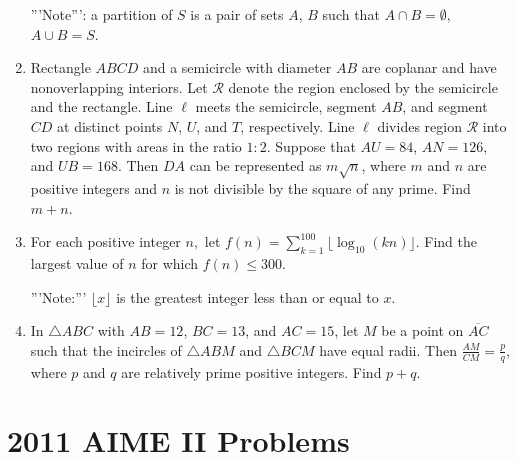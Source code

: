 \documentclass{article}
\begin{document}
\begin{enumerate}[label=\arabic*., itemsep=0.5em]
'''Note''': a partition of \(S\) is a pair of sets \(A\), \(B\) such that \(A \cap B = \emptyset\), \(A \cup B = S\).\par \vspace{0.5em}\item Rectangle \(ABCD\) and a semicircle with diameter \(AB\) are coplanar and have nonoverlapping interiors. Let \(\mathcal{R}\) denote the region enclosed by the semicircle and the rectangle. Line \(\ell\) meets the semicircle, segment \(AB\), and segment \(CD\) at distinct points \(N\), \(U\), and \(T\), respectively. Line \(\ell\) divides region \(\mathcal{R}\) into two regions with areas in the ratio \(1: 2\). Suppose that \(AU = 84\), \(AN = 126\), and \(UB = 168\). Then \(DA\) can be represented as \(m\sqrt {n}\), where \(m\) and \(n\) are positive integers and \(n\) is not divisible by the square of any prime. Find \(m + n\).\par \vspace{0.5em}\item For each positive integer \(n,\) let \(f(n) = \sum_{k = 1}^{100} \lfloor \log_{10} (kn) \rfloor\). Find the largest value of \(n\) for which \(f(n) \le 300\).

'''Note:''' \(\lfloor x \rfloor\) is the greatest integer less than or equal to \(x\).\par \vspace{0.5em}\item In \(\triangle{ABC}\) with \(AB = 12\), \(BC = 13\), and \(AC = 15\), let \(M\) be a point on \(\overline{AC}\) such that the incircles of \(\triangle{ABM}\) and \(\triangle{BCM}\) have equal radii. Then \(\frac{AM}{CM} = \frac{p}{q}\), where \(p\) and \(q\) are relatively prime positive integers. Find \(p + q\).\par \vspace{0.5em}
\end{enumerate}
\newpage\section*{2011 AIME II Problems}
\end{document}
